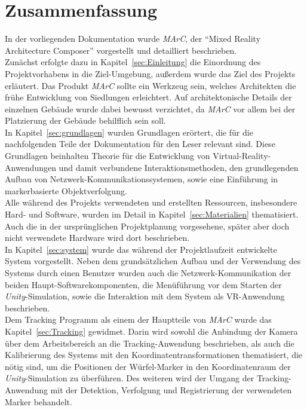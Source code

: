 \section{Zusammenfassung}
In der vorliegenden Dokumentation wurde \emph{MArC}, der "`Mixed Reality Architecture Composer"' vorgestellt und detailliert beschrieben.\\
Zunächst erfolgte dazu in Kapitel~\ref{sec:Einleitung} die Einordnung des Projektvorhabens in die Ziel-Umgebung, außerdem wurde das Ziel des Projekts erläutert. Das Produkt \emph{MArC} sollte ein Werkzeug sein, welches Architekten die frühe Entwicklung von Siedlungen erleichtert. Auf architektonische Details der einzelnen Gebäude wurde dabei bewusst verzichtet, da \emph{MArC} vor allem bei der Platzierung der Gebäude behilflich sein soll.\\
In Kapitel~\ref{sec:grundlagen} wurden Grundlagen erörtert, die für die nachfolgenden Teile der Dokumentation für den Leser relevant sind. Diese Grundlagen beinhalten Theorie für die Entwicklung von Virtual-Reality-Anwendungen und damit verbundene Interaktionsmethoden, den grundlegenden Aufbau von Netz\-werk-Kom\-mu\-ni\-ka\-tions\-systemen, sowie eine Einführung in markerbasierte Objektverfolgung.\\
Alle während des Projekts verwendeten und erstellten Ressourcen, insbesondere Hard- und Software, wurden im Detail in Kapitel~\ref{sec:Materialien} thematisiert. Auch die in der ursprünglichen Projektplanung vorgesehene, später aber doch nicht verwendete Hardware wird dort beschrieben.\\
In Kapitel~\ref{sec:system} wurde das während der Projektlaufzeit entwickelte System vorgestellt. Neben dem grundsätzlichen Aufbau und der Verwendung des Systems durch einen Benutzer wurden auch die Netz\-werk-Kom\-mu\-ni\-ka\-tion der beiden Haupt-Soft\-ware\-kom\-po\-nen\-ten, die Menüführung vor dem Starten der \emph{Unity}-Simulation, sowie die Interaktion mit dem System als VR-Anwendung beschrieben.\\
Dem Tracking Programm als einem der Hauptteile von \emph{MArC} wurde das Kapitel~\ref{sec:Tracking} gewidmet. Darin wird sowohl die Anbindung der Kamera über dem Arbeitsbereich an die Tracking-Anwendung beschrieben, als auch die Kalibrierung des Systems mit den Koordinatentransformationen thematisiert, die nötig sind, um die Positionen der Würfel-Marker in den Koordinatenraum der \emph{Unity}-Simulation zu überführen. Des weiteren wird der Umgang der Tracking-Anwendung mit der Detektion, Verfolgung und Registrierung der verwendeten Marker behandelt.\\
